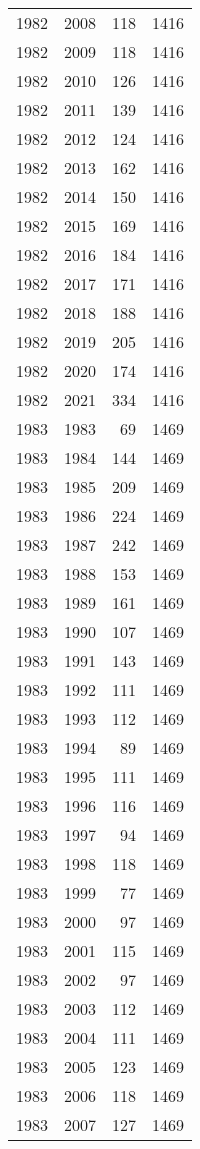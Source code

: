 \documentclass[
  11pt,
  letterpaper,
  DIV=11,
  numbers=noendperiod,
  twoside]{scrartcl}
\begin{document}
\begin{longtable}[]{@{}rrrr@{}}
1982 & 2008 & 118 & 1416 \\
1982 & 2009 & 118 & 1416 \\
1982 & 2010 & 126 & 1416 \\
1982 & 2011 & 139 & 1416 \\
1982 & 2012 & 124 & 1416 \\
1982 & 2013 & 162 & 1416 \\
1982 & 2014 & 150 & 1416 \\
1982 & 2015 & 169 & 1416 \\
1982 & 2016 & 184 & 1416 \\
1982 & 2017 & 171 & 1416 \\
1982 & 2018 & 188 & 1416 \\
1982 & 2019 & 205 & 1416 \\
1982 & 2020 & 174 & 1416 \\
1982 & 2021 & 334 & 1416 \\
1983 & 1983 & 69 & 1469 \\
1983 & 1984 & 144 & 1469 \\
1983 & 1985 & 209 & 1469 \\
1983 & 1986 & 224 & 1469 \\
1983 & 1987 & 242 & 1469 \\
1983 & 1988 & 153 & 1469 \\
1983 & 1989 & 161 & 1469 \\
1983 & 1990 & 107 & 1469 \\
1983 & 1991 & 143 & 1469 \\
1983 & 1992 & 111 & 1469 \\
1983 & 1993 & 112 & 1469 \\
1983 & 1994 & 89 & 1469 \\
1983 & 1995 & 111 & 1469 \\
1983 & 1996 & 116 & 1469 \\
1983 & 1997 & 94 & 1469 \\
1983 & 1998 & 118 & 1469 \\
1983 & 1999 & 77 & 1469 \\
1983 & 2000 & 97 & 1469 \\
1983 & 2001 & 115 & 1469 \\
1983 & 2002 & 97 & 1469 \\
1983 & 2003 & 112 & 1469 \\
1983 & 2004 & 111 & 1469 \\
1983 & 2005 & 123 & 1469 \\
1983 & 2006 & 118 & 1469 \\
1983 & 2007 & 127 & 1469 \\

\end{longtable}
\end{document}
